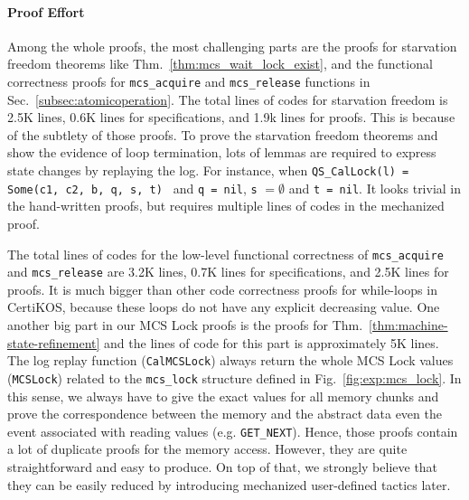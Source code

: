 
\paragraph{Proof Effort}


Among the whole proofs, the most challenging parts are the proofs for starvation 
freedom theorems like Thm.~\ref{thm:mcs_wait_lock_exist}, 
and the functional correctness proofs for \lstinline$mcs_acquire$ 
and \lstinline$mcs_release$ functions
in Sec.~\ref{subsec:atomicoperation}.
The total lines of codes for starvation freedom is 2.5K lines, 0.6K lines for specifications, 
and 1.9k lines for proofs. This is because of the subtlety of those proofs. 
To prove the starvation freedom theorems and show the evidence of loop termination,
lots of lemmas are required to express
state changes by replaying the log. For instance, 
when \lstinline$QS_CalLock(l) = Some(c1, c2, b, q, s, t) $ 
and \lstinline$q = nil$, \lstinline$s$ $=\emptyset$ 
and \lstinline$t = nil$. It looks trivial in the hand-written proofs, 
but requires multiple lines of codes in the mechanized proof. 

The total lines of codes for the low-level functional correctness 
of \lstinline$mcs_acquire$ and \lstinline$mcs_release$ are 3.2K lines,  
0.7K lines for specifications, and 2.5K lines for proofs.
It is much bigger than other code correctness proofs for while-loops in CertiKOS, 
because these loops do not have any explicit decreasing value.
One another big part in our MCS Lock proofs is the proofs for 
Thm.~\ref{thm:machine-state-refinement} and the lines of code for this part is 
approximately 5K lines. The log replay function (\lstinline$CalMCSLock$) always 
return the whole MCS Lock values (\lstinline$MCSLock$) related 
to the  \lstinline$mcs_lock$ structure defined in Fig.~\ref{fig:exp:mcs_lock}. 
In this sense, we always have to give the exact values for all memory 
chunks and prove the correspondence between the memory and the abstract 
data even the event associated with reading values (e.g. \lstinline$GET_NEXT$).
Hence, those proofs contain a lot of duplicate proofs for the memory access. 
However, they are quite straightforward and easy to produce. 
On top of that, we strongly believe 
that they can be easily reduced by introducing mechanized user-defined tactics later. 

